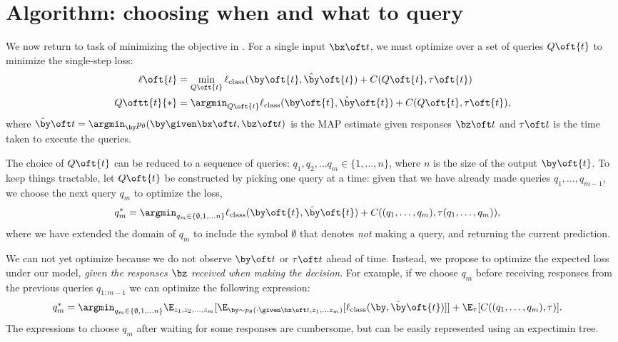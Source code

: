 \section{Algorithm: choosing when and what to query}
\label{sec:async}

We now return to task of minimizing the objective in .
For a single input $\bx\oft t$, we must optimize over a set of queries $Q\oft{t}$ to minimize the single-step loss:
\begin{align*}
  \ell\oft{t} &= \min_{Q\oft{t}} \ell_{\rmclass}(\by\oft{t}, \byt\oft{t}) + C(Q\oft{t}, \tau\oft{t}) \\
  Q\oftt{t}{*} &= \argmin_{Q\oft{t}} \ell_{\rmclass}(\by\oft{t}, \byt\oft{t}) + C(Q\oft{t}, \tau\oft{t}),
\end{align*}
where $\byt\oft t = \argmin_{\by} \p(\by \given \bx \oft t, \bz\oft t)$ is the MAP estimate given responses $\bz\oft t$ and $\tau\oft t$ is the time taken to execute the queries.

The choice of $Q\oft{t}$ can be reduced to a sequence of queries: $q_1, q_2, \ldots q_m \in \{1, \ldots, n\}$, where $n$ is the size of the output $\by\oft{t}$.
To keep things tractable, let $Q\oft{t}$ be constructed by picking one query at a time:
given that we have already made queries $q_1, \ldots, q_{m-1}$, we choose the next query $q_m$ to optimize the loss,
\begin{align}
  q_m^* &= \argmin_{q_m \in \{\emptyset, 1, \ldots n\}} \ell_{\rmclass}(\by\oft{t}, \byt\oft{t}) + C((q_1, \ldots, q_m), \tau(q_1, \ldots, q_m)), \label{eqn:one-step-q}
\end{align}
where we have extended the domain of $q_m$ to include the symbol $\emptyset$ that denotes {\em not\/} making a query, and returning the current prediction.

We can not yet optimize  because we do not observe $\by\oft t$ or $\tau\oft t$ ahead of time.
Instead, we propose to optimize the expected loss under our model, {\em given the responses $\bz$ received when making the decision}.
For example, if we choose $q_m$ before receiving responses from the previous queries $q_{1:m-1}$ we can optimize the following expression:
\begin{align}
  q_m^* &= \argmin_{q_m \in \{\emptyset, 1, \ldots n\}} 
  \E_{z_1, z_2, \ldots, z_{m}}[\E_{\by \sim \p(\cdot \given \bx\oft t, z_1, \ldots z_m)}[\ell_{\rmclass}(\by, \byt\oft{t})]] + \E_{\tau}[C((q_1, \ldots, q_m), \tau)]. \label{eqn:cumbersome}
\end{align}
The expressions to choose $q_m$ after waiting for some responses are cumbersome, but can be easily represented using an expectimin tree.

